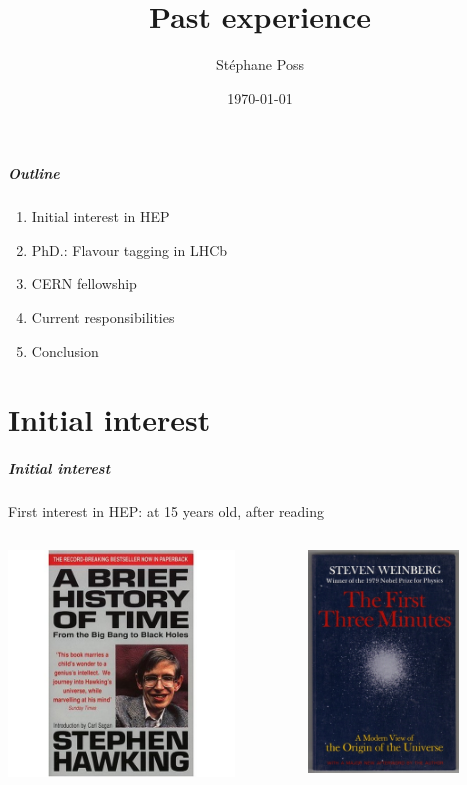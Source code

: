 \documentclass{beamer}
\title{Past experience}
\author{St\'ephane Poss}
\date{\today}
\begin{document}
\begin{frame}
\titlepage
\end{frame}

\begin{frame}
\frametitle{Outline}
\begin{enumerate}
  \item Initial interest in HEP
  \item PhD.: Flavour tagging in LHCb
  \item CERN fellowship
  \item Current responsibilities
  \item Conclusion
\end{enumerate}
\end{frame}
 
\part{Initial interest}
\begin{frame}
\partpage
\end{frame}
\begin{frame}
\frametitle{Initial interest}
First interest in HEP: at {\color{blue}15 years old}, after reading 
\begin{columns}
\begin{column}{6cm}
\begin{center}
\includegraphics[width=6cm]{briefhist}
\end{center}
\end{column}
\begin{column}{6cm}
\begin{center}
\includegraphics[width=4cm]{firstthree}
\end{center}
\end{column}
\end{columns}
\end{frame}
\end{document}
